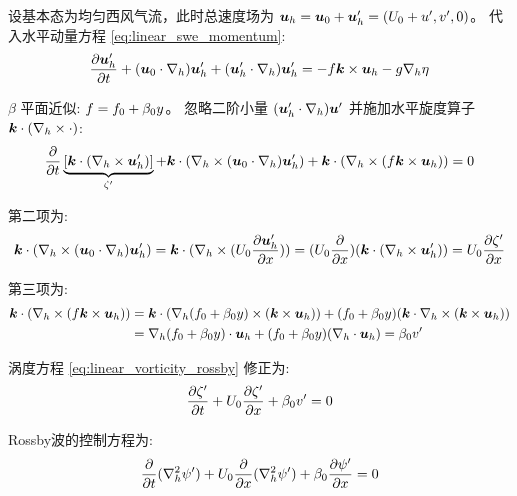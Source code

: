 \begin{enumerate}
    设基本态为均匀西风气流，此时总速度场为 $\bm{u}_h = \bm{u}_0 + \bm{u}_h^\prime = (U_0 + u^\prime, v^\prime, 0)$。
    代入水平动量方程 \eqref{eq:linear_swe_momentum}:
    \begin{equation*}
        \pde{\vel_h^\prime}{\timevar} + (\vel_0 \cdot \nabla_h) \vel_h^\prime + (\vel_h^\prime \cdot \nabla_h) \vel_h^\prime = - \coriolis \kvec \times \vel_h - \gravityconst \nabla_h \freeheight
    \end{equation*}

    $\beta$ 平面近似: $f = f_0 + \beta_0 y$。
    忽略二阶小量 $(\bm{u}_h^\prime \cdot \nabla_h) \bm{u}^\prime$ 并施加水平旋度算子 $\bm{k} \cdot (\nabla_h \times \cdot)$:
    \begin{equation*}
        \pde{}{\timevar}\underbrace{\left[\kvec \cdot (\nabla_h \times \vel_h^\prime)\right]}_{\relvort^\prime} + \kvec \cdot (\nabla_h \times (\vel_0 \cdot \nabla_h) \vel_h^\prime) + \kvec \cdot (\nabla_h \times (\coriolis \kvec \times \vel_h)) = 0
    \end{equation*}

    第二项为:
    \begin{equation*}
        \kvec \cdot (\nabla_h \times (\vel_0 \cdot \nabla_h) \vel_h^\prime) =
        \kvec \cdot (\nabla_h \times (\hvel_0 \pde{\vel_h^\prime}{x})) =
        (\hvel_0 \pde{}{x}) (\kvec \cdot (\nabla_h \times \vel_h^\prime)) = \hvel_0 \pde{\relvort^\prime}{x}
    \end{equation*}

    第三项为:
    \begin{align*}
    \bm{k} \cdot (\nabla_h \times (f \bm{k} \times \bm{u}_h)) &= \bm{k} \cdot (\nabla_h(f_0 + \beta_0 y) \times (\bm{k} \times \bm{u}_h)) + (f_0 + \beta_0 y) (\bm{k} \cdot \nabla_h \times (\bm{k} \times \bm{u}_h)) \\
    &= \nabla_h(f_0 + \beta_0 y) \cdot \bm{u}_h + (f_0 + \beta_0 y) (\nabla_h \cdot \bm{u}_h) = \beta_0 v^\prime
    \end{align*}

    涡度方程 \eqref{eq:linear_vorticity_rossby} 修正为:
    \begin{equation*}
        \pde{\relvort^\prime}{\timevar} + \hvel_0 \pde{\relvort^\prime}{x} + \rossby_0 v^\prime = 0
    \end{equation*}

    Rossby波的控制方程为:
    \begin{equation*}
        \pde{}{\timevar}(\nabla_h^2 \streamfunc^\prime) + \hvel_0 \pde{}{x}(\nabla_h^2 \streamfunc^\prime) + \rossby_0 \pde{\streamfunc^\prime}{x} = 0
    \end{equation*}


\end{enumerate}
